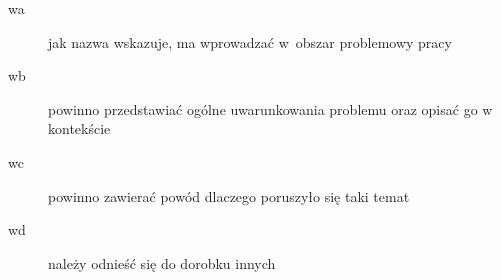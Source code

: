 \documentclass{xmgr}
\begin{document}
\maketitle
%
\introduction

\begin{description}
\item[wa] \textcolor{wa}{jak nazwa wskazuje, ma wprowadzać
  w~obszar problemowy pracy}
\item[wb] \textcolor{wb}{powinno przedstawiać ogólne
  uwarunkowania problemu oraz opisać go w kontekście}
\item[wc] \textcolor{wc}{powinno zawierać powód dlaczego
  poruszyło się taki temat}
\item[wd] \textcolor{wd}{należy odnieść się do dorobku innych}
\end{description}
\end{document}
